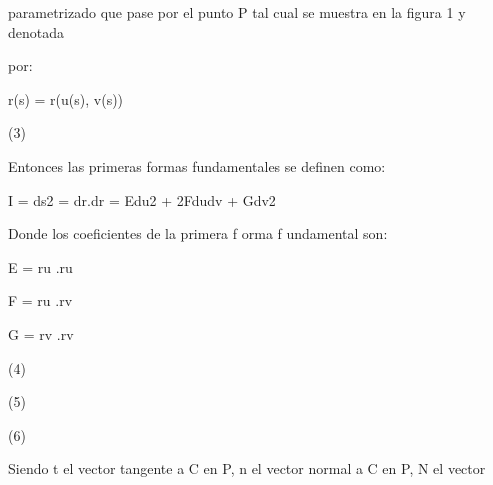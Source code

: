 \documentclass[a4paper,portrait,12pt]{article}
\begin{document}
\begin{flushleft}
\newpage
parametrizado que pase por el punto P tal cual se muestra en la figura 1 y denotada
\end{flushleft}


\begin{flushleft}
por:
\end{flushleft}


\begin{flushleft}
r(s) = r(u(s), v(s))
\end{flushleft}





(3)





\begin{flushleft}
Entonces las primeras formas fundamentales se definen como:
\end{flushleft}





\begin{flushleft}
I = ds2 = dr.dr = Edu2 + 2Fdudv + Gdv2
\end{flushleft}





\begin{flushleft}
Donde los coeficientes de la primera f orma f undamental son:
\end{flushleft}


\begin{flushleft}
E = ru .ru
\end{flushleft}


\begin{flushleft}
F = ru .rv
\end{flushleft}


\begin{flushleft}
G = rv .rv
\end{flushleft}





(4)


(5)


(6)





\begin{flushleft}
Siendo t el vector tangente a C en P, n el vector normal a C en P, N el vector
\end{flushleft}
\end{document}
